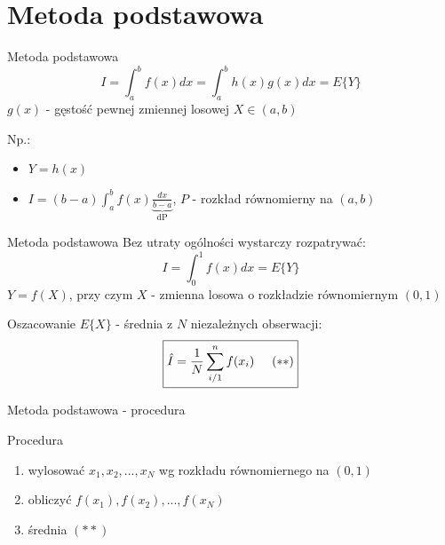 \section{Metoda podstawowa}
\begin{frame}{Metoda podstawowa}
	\[
    	I = \int_a^b f(x) dx = \int_a^b h(x)g(x) dx = E\{Y\}
    \]
    $g(x)$ - gęstość pewnej zmiennej losowej $X \in (a, b)$
    
    Np.:
    \begin{itemize}
    	\item $Y = h(x)$
        \item $I = (b-a) \int_a^b f(x) \underbrace{\frac{dx}{b-a}}_\text{dP}$, $P$ - rozkład równomierny na $(a, b)$
    \end{itemize}
    
\end{frame}
\begin{frame}{Metoda podstawowa}
    Bez utraty ogólności wystarczy rozpatrywać: \[
    	I = \int_0^1 f(x) dx = E\{Y\}
    \]
    $Y = f(X)$, przy czym $X$ - zmienna losowa o rozkładzie równomiernym $(0, 1)$
    
    Oszacowanie $E\{X\}$ - średnia z $N$ niezależnych obserwacji: \[
    	\boxed{
        \hat{I} = \frac{1}{N} \sum_{i/1}^n f(x_i) \hspace{.5cm} (**)
        }
    \]
\end{frame}
\begin{frame}{Metoda podstawowa - procedura}
    \begin{block}{Procedura}
        \begin{enumerate}[1)]
            \item wylosować $x_1, x_2, ..., x_N$ wg rozkładu równomiernego na $(0, 1)$
            \item obliczyć $f(x_1), f(x_2), ..., f(x_N)$
            \item średnia $(**)$
        \end{enumerate}
    \end{block}
\end{frame}
